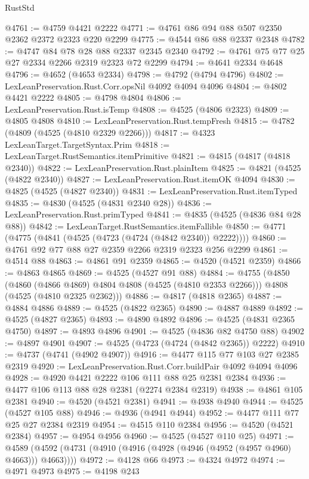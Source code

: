 \begin{lexlean}{RustStd}
\begin{coremodule}
{\begin{coremodule}
{{{{{{{{{{{{{{@4761 := @4759 @4421 @2222
@4771 := @4761 @86 @94 @88 @507 @2350 @2362 @2372 @2323 @220 @2299
@4775 := @4544 @86 @88 @2337 @2348
@4782 := @4747 @84 @78 @28 @88 @2337 @2345 @2340
@4792 := @4761 @75 @77 @25 @27 @2334 @2266 @2319 @2323 @72 @2299
@4794 := @4641 @2334 @4648
@4796 := @4652 (@4653 @2334)
@4798 := @4792 (@4794 @4796)
@4802 := LexLeanPreservation.Rust.Corr.opsNil @4092 @4094 @4096
@4804 := @4802 @4421 @2222
@4805 := @4798 @4804
@4806 := LexLeanPreservation.Rust.isTemp
@4808 := @4525 (@4806 @2323)
@4809 := @4805 @4808
@4810 := LexLeanPreservation.Rust.tempFresh
@4815 := @4782 (@4809 (@4525 (@4810 @2329 @2266)))
@4817 := @4323 LexLeanTarget.TargetSyntax.Prim
@4818 := LexLeanTarget.RustSemantics.itemPrimitive
@4821 := @4815 (@4817 (@4818 @2340))
@4822 := LexLeanPreservation.Rust.plainItem
@4825 := @4821 (@4525 (@4822 @2340))
@4827 := LexLeanPreservation.Rust.itemOK @4094
@4830 := @4825 (@4525 (@4827 @2340))
@4831 := LexLeanPreservation.Rust.itemTyped
@4835 := @4830 (@4525 (@4831 @2340 @28))
@4836 := LexLeanPreservation.Rust.primTyped
@4841 := @4835 (@4525 (@4836 @84 @28 @88))
@4842 := LexLeanTarget.RustSemantics.itemFallible
@4850 := @4771 (@4775 (@4841 (@4525 (@4723 (@4724 (@4842 @2340)) @2222))))
@4860 := @4761 @92 @77 @88 @27 @2359 @2266 @2319 @2323 @256 @2299
@4861 := @4514 @88
@4863 := @4861 @91 @2359
@4865 := @4520 (@4521 @2359)
@4866 := @4863 @4865
@4869 := @4525 (@4527 @91 @88)
@4884 := @4755
    (@4850
      (@4860 (@4866 @4869) @4804 @4808 (@4525 (@4810 @2353 @2266)))
      @4808
      (@4525 (@4810 @2325 @2362)))
@4886 := @4817 (@4818 @2365)
@4887 := @4884 @4886
@4889 := @4525 (@4822 @2365)
@4890 := @4887 @4889
@4892 := @4525 (@4827 @2365)
@4893 := @4890 @4892
@4896 := @4525 (@4831 @2365 @4750)
@4897 := @4893 @4896
@4901 := @4525 (@4836 @82 @4750 @88)
@4902 := @4897 @4901
@4907 := @4525 (@4723 (@4724 (@4842 @2365)) @2222)
@4910 := @4737 (@4741 (@4902 @4907))
@4916 := @4477 @115 @77 @103 @27 @2385 @2319
@4920 := LexLeanPreservation.Rust.Corr.buildPair @4092 @4094 @4096
@4928 := @4920 @4421 @2222 @106 @111 @88 @25 @2381 @2384
@4936 := @4477 @106 @113 @88 @28 @2381 (@2274 @2384 @2319)
@4938 := @4861 @105 @2381
@4940 := @4520 (@4521 @2381)
@4941 := @4938 @4940
@4944 := @4525 (@4527 @105 @88)
@4946 := @4936 (@4941 @4944)
@4952 := @4477 @111 @77 @25 @27 @2384 @2319
@4954 := @4515 @110 @2384
@4956 := @4520 (@4521 @2384)
@4957 := @4954 @4956
@4960 := @4525 (@4527 @110 @25)
@4971 := @4589 (@4592 (@4731 (@4910 (@4916 (@4928 (@4946 (@4952 (@4957 @4960) @4663))) @4663))))
@4972 := @4128 @66
@4973 := @4324 @4972
@4974 := @4971 @4973
@4975 := @4198 @243
}}}}}}}}}}}}}}
\end{coremodule}}
\end{coremodule}
\end{lexlean}
